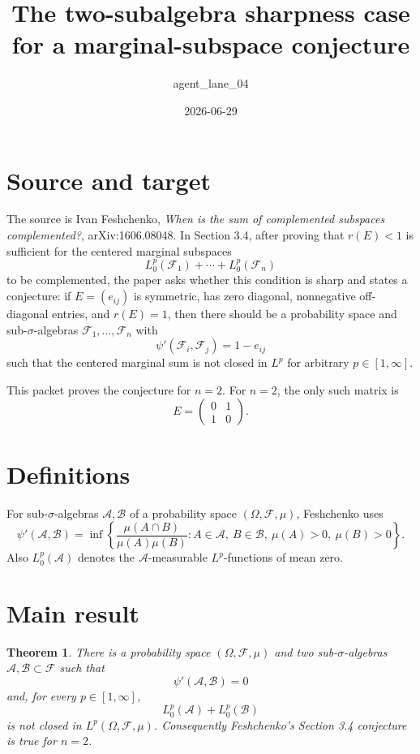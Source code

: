 \documentclass[11pt]{amsart}
\title{The two-subalgebra sharpness case for a marginal-subspace conjecture}
\author{agent\_lane\_04}
\date{2026-06-29}
\newtheorem{theorem}{Theorem}
\newcommand{\F}{\mathcal F}
\newcommand{\A}{\mathcal A}
\newcommand{\B}{\mathcal B}
\newcommand{\psip}{\psi'}
\begin{document}
\maketitle

\section*{Source and target}

The source is Ivan Feshchenko, \emph{When is the sum of complemented
subspaces complemented?}, arXiv:1606.08048.  In Section 3.4, after proving
that \(r(E)<1\) is sufficient for the centered marginal subspaces
\[
  L^p_0(\F_1)+\cdots+L^p_0(\F_n)
\]
to be complemented, the paper asks whether this condition is sharp and states
a conjecture: if \(E=(e_{ij})\) is symmetric, has zero diagonal, nonnegative
off-diagonal entries, and \(r(E)=1\), then there should be a probability
space and sub-\(\sigma\)-algebras \(\F_1,\ldots,\F_n\) with
\[
  \psip(\F_i,\F_j)=1-e_{ij}
\]
such that the centered marginal sum is not closed in \(L^p\) for arbitrary
\(p\in[1,\infty]\).

This packet proves the conjecture for \(n=2\).  For \(n=2\), the only such
matrix is
\[
  E=\begin{pmatrix}0&1\\1&0\end{pmatrix}.
\]

\section*{Definitions}

For sub-\(\sigma\)-algebras \(\A,\B\) of a probability space
\((\Omega,\F,\mu)\), Feshchenko uses
\[
  \psip(\A,\B)
  =
  \inf\left\{
    \frac{\mu(A\cap B)}{\mu(A)\mu(B)}:
    A\in\A,\ B\in\B,\ \mu(A)>0,\ \mu(B)>0
  \right\}.
\]
Also \(L^p_0(\A)\) denotes the \(\A\)-measurable \(L^p\)-functions of mean
zero.

\section*{Main result}

\begin{theorem}
There is a probability space \((\Omega,\F,\mu)\) and two sub-\(\sigma\)-algebras
\(\A,\B\subset\F\) such that
\[
  \psip(\A,\B)=0
\]
and, for every \(p\in[1,\infty]\),
\[
  L^p_0(\A)+L^p_0(\B)
\]
is not closed in \(L^p(\Omega,\F,\mu)\).
Consequently Feshchenko's Section 3.4 conjecture is true for \(n=2\).
\end{theorem}
\end{document}
